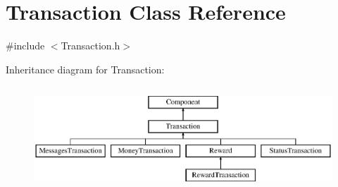 \hypertarget{classTransaction}{}\section{Transaction Class Reference}
\label{classTransaction}


{\ttfamily \#include $<$Transaction.\+h$>$}

Inheritance diagram for Transaction\+:\begin{figure}[H]
\begin{center}
\leavevmode
\includegraphics[height=3.916084cm]{classTransaction}
\end{center}
\end{figure}
